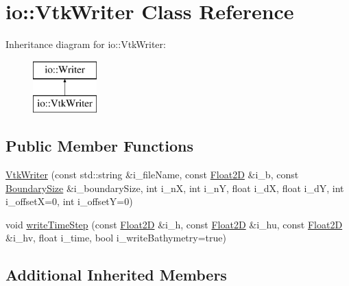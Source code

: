 \hypertarget{classio_1_1VtkWriter}{\section{io\-:\-:Vtk\-Writer Class Reference}
\label{classio_1_1VtkWriter}
}
Inheritance diagram for io\-:\-:Vtk\-Writer\-:\begin{figure}[H]
\begin{center}
\leavevmode
\includegraphics[height=2.000000cm]{classio_1_1VtkWriter}
\end{center}
\end{figure}
\subsection*{Public Member Functions}
\begin{DoxyCompactItemize}
\item 
\hyperlink{classio_1_1VtkWriter_aaed37669d1c38bafaf3fc36169342720}{Vtk\-Writer} (const std\-::string \&i\-\_\-file\-Name, const \hyperlink{classFloat2D}{Float2\-D} \&i\-\_\-b, const \hyperlink{structio_1_1BoundarySize}{Boundary\-Size} \&i\-\_\-boundary\-Size, int i\-\_\-n\-X, int i\-\_\-n\-Y, float i\-\_\-d\-X, float i\-\_\-d\-Y, int i\-\_\-offset\-X=0, int i\-\_\-offset\-Y=0)
\item 
void \hyperlink{classio_1_1VtkWriter_a76a308d810ee45bf8260afcae20c4f6c}{write\-Time\-Step} (const \hyperlink{classFloat2D}{Float2\-D} \&i\-\_\-h, const \hyperlink{classFloat2D}{Float2\-D} \&i\-\_\-hu, const \hyperlink{classFloat2D}{Float2\-D} \&i\-\_\-hv, float i\-\_\-time, bool i\-\_\-write\-Bathymetry=true)
\end{DoxyCompactItemize}
\subsection*{Additional Inherited Members}


